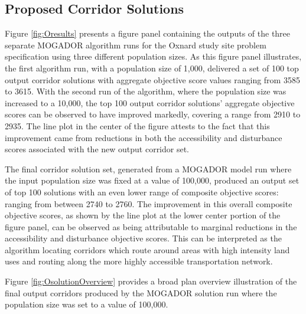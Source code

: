     \subsection{Proposed Corridor Solutions}

Figure \ref{fig:Oresults} presents a figure panel containing the outputs of the three separate MOGADOR algorithm runs for the Oxnard study site problem specification using three different population sizes. As this figure panel illustrates, the first algorithm run, with a population size of 1,000, delivered a set of 100 top output corridor solutions with aggregate objective score values ranging from 3585 to 3615. With the second run of the algorithm, where the population size was increased to a 10,000, the top 100 output corridor solutions' aggregate objective scores can be observed to have improved markedly, covering a range from 2910 to 2935. The line plot in the center of the figure attests to the fact that this improvement came from reductions in both the accessibility and disturbance scores associated with the new output corridor set.

The final corridor solution set, generated from a MOGADOR model run where the input population size was fixed at a value of 100,000, produced an output set of top 100 solutions with an even lower range of composite objective scores: ranging from between 2740 to 2760. The improvement in this overall composite objective scores, as shown by the line plot at the lower center portion of the figure panel, can be observed as being attributable to marginal reductions in the accessibility and disturbance objective scores.  This can be interpreted as the algorithm locating corridors which route around areas with high intensity land uses and routing along the more highly accessible transportation network.

Figure \ref{fig:OsolutionOverview} provides a broad plan overview illustration of the final output corridors produced by the MOGADOR solution run where the population size was set to a value of 100,000. 


